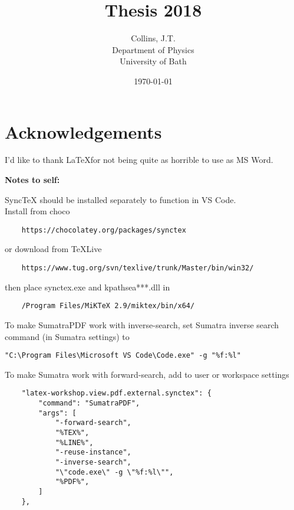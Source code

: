 \documentclass[11pt,a4paper,final]{report}
\title{Thesis 2018}
\author{
	Collins, J.T. \\ 
	Department of Physics\\
	University of Bath\\
}
\date{\today}
\begin{document}
\begin{titlepage}
    
\end{titlepage}

\begin{abstract}
	\setcounter{page}{0}  %
    
\end{abstract}
\clearpage

\clearpage 
\tableofcontents
\clearpage


\chapter*{Acknowledgements}

\color{red}
I'd like to thank \LaTeX  for not being quite as horrible to use as MS Word.

\noindent\textbf{Notes to self:}

\noindent SyncTeX should be installed separately to function in VS Code. \\
Install from choco
\begin{verbatim}
	https://chocolatey.org/packages/synctex
\end{verbatim}
or download from TeXLive 
\begin{verbatim}
	https://www.tug.org/svn/texlive/trunk/Master/bin/win32/
\end{verbatim}
then place synctex.exe and kpathsea***.dll in 
\begin{verbatim}
	/Program Files/MiKTeX 2.9/miktex/bin/x64/
\end{verbatim}

\noindent To make SumatraPDF work with inverse-search, set Sumatra inverse search command (in Sumatra settings) to 
\begin{verbatim}
"C:\Program Files\Microsoft VS Code\Code.exe" -g "%f:%l"
\end{verbatim}

\noindent To make Sumatra work with forward-search, add to user or workspace settings
\begin{verbatim}
	"latex-workshop.view.pdf.external.synctex": {
		"command": "SumatraPDF",
		"args": [
			"-forward-search",
			"%TEX%",
			"%LINE%",
			"-reuse-instance",
			"-inverse-search",
			"\"code.exe\" -g \"%f:%l\"",
			"%PDF%",
		]
	},
\end{verbatim}
\end{document}
